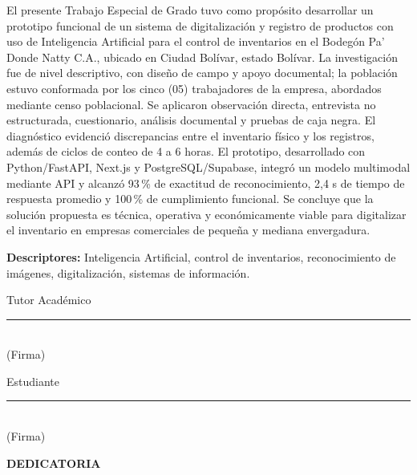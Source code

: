 \documentclass[12pt, letterpaper]{report}
\begin{document}
\vspace{2pt}

{\noindent
El presente Trabajo Especial de Grado tuvo como propósito desarrollar
un prototipo funcional de un sistema de digitalización y registro de
productos con uso de Inteligencia Artificial para el control de
inventarios en el Bodegón Pa' Donde Natty C.A., ubicado en Ciudad
Bolívar, estado Bolívar. La investigación fue de nivel descriptivo,
con diseño de campo y apoyo documental; la población estuvo conformada
por los cinco (05) trabajadores de la empresa, abordados mediante censo
poblacional. Se aplicaron observación directa, entrevista no
estructurada, cuestionario, análisis documental y pruebas de caja
negra. El diagnóstico evidenció discrepancias entre el inventario
físico y los registros, además de ciclos de conteo de 4 a 6 horas. El
prototipo, desarrollado con Python/FastAPI, Next.js y
PostgreSQL/Supabase, integró un modelo multimodal mediante API y
alcanzó 93\,\% de exactitud de reconocimiento, 2,4 s de tiempo de
respuesta promedio y 100\,\% de cumplimiento funcional. Se concluye
que la solución propuesta es técnica, operativa y económicamente
viable para digitalizar el inventario en empresas comerciales de
pequeña y mediana envergadura.\par}

\vspace{3pt}

{\noindent
\textbf{Descriptores:} Inteligencia Artificial, control de
inventarios, reconocimiento de imágenes, digitalización, sistemas de
información.\par}

\vspace{0.15cm}

\noindent\begin{minipage}{0.45\textwidth}
\centering
Tutor Académico\\[8pt]
\rule{5cm}{0.4pt}\\
(Firma)
\end{minipage}\hfill
\begin{minipage}{0.45\textwidth}
\centering
Estudiante\\[8pt]
\rule{5cm}{0.4pt}\\
(Firma)
\end{minipage}

\clearpage
\begin{center}
{\fontsize{14}{16}\selectfont\bfseries DEDICATORIA\par}
\end{center}
\vspace{0.6cm}
\end{document}
